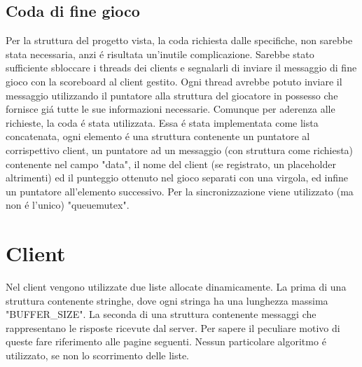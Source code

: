 \subsection{Coda di fine gioco}

Per la struttura del progetto vista, la coda richiesta dalle specifiche, non sarebbe stata necessaria, anzi \'e risultata un'inutile complicazione. Sarebbe stato sufficiente sbloccare i threads dei clients e segnalarli di inviare il messaggio di fine gioco con la scoreboard al client gestito. Ogni thread avrebbe potuto inviare il messaggio utilizzando il puntatore alla struttura del giocatore in possesso che fornisce gi\'a tutte le sue informazioni necessarie. Comunque per aderenza alle richieste, la coda \'e stata utilizzata. Essa \'e stata implementata come lista concatenata, ogni elemento \'e una struttura contenente un puntatore al corrispettivo client, un puntatore ad un messaggio (con struttura come richiesta) contenente nel campo "data", il nome del client (se registrato, un placeholder altrimenti) ed il punteggio ottenuto nel gioco separati con una virgola, ed infine un puntatore all'elemento successivo. Per la sincronizzazione viene utilizzato (ma non \'e l'unico) "queuemutex".
	
\section{Client}

Nel client vengono utilizzate due liste allocate dinamicamente. La prima di una struttura contenente stringhe, dove ogni stringa ha una lunghezza massima "BUFFER\_SIZE". La seconda di una struttura contenente messaggi che rappresentano le risposte ricevute dal server. Per sapere il peculiare motivo di queste fare riferimento alle pagine seguenti. Nessun particolare algoritmo \'e utilizzato, se non lo scorrimento delle liste.



